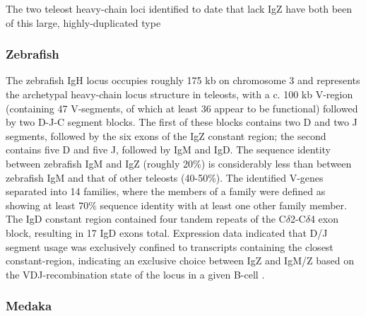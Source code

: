 The two %
teleost heavy-chain loci identified to date that lack IgZ have both %
been of this large, highly-duplicated type \citep{fillatreau2013astonishing}


\subsubsection{Zebrafish}

The zebrafish IgH locus occupies roughly 175 kb on chromosome 3 \citep{danilova2005zebrafishIgH} and represents the archetypal heavy-chain locus structure in teleosts, with a c. 100 kb V-region (containing 47 V-segments, of which at least 36 appear to be functional) followed by two D-J-C segment blocks. The first of these blocks contains two D and two J segments, followed by the six exons of the IgZ constant region; the second contains five D and five J, followed by IgM and IgD. The sequence identity between zebrafish IgM and IgZ (roughly 20\%) is considerably less than between zebrafish IgM and that of other teleosts (40-50\%). The identified V-genes separated into 14 families, where the members of a family were defined as showing at least 70\% sequence identity with at least one other family member. The IgD constant region contained four tandem repeats of the C$\delta$2-C$\delta$4 exon block, resulting in 17 IgD exons total. Expression data indicated that D/J segment usage was exclusively confined to transcripts containing the closest constant-region, indicating an exclusive choice between IgZ and IgM/Z based on the VDJ-recombination state of the locus in a given B-cell %
. %

\subsubsection{Medaka}

